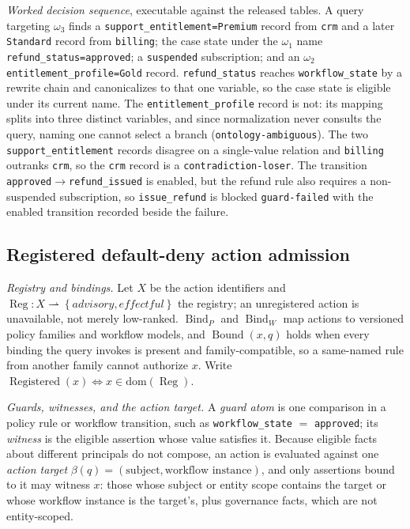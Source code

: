 \documentclass[conference]{IEEEtran}
\newcommand{\reason}[1]{\texttt{#1}}
\newcommand{\set}[1]{\left\{#1\right\}}
\begin{document}
\smallskip
\noindent\textit{Worked decision sequence}, executable against the released tables. A query targeting $\omega_3$ finds a \texttt{support\_entitlement=Premium} record from \texttt{crm} and a later \texttt{Standard} record from \texttt{billing}; the case state under the $\omega_1$ name \texttt{refund\_status=approved}; a \texttt{suspended} subscription; and an $\omega_2$ \texttt{entitlement\_profile=Gold} record. \texttt{refund\_status} reaches \texttt{workflow\_state} by a rewrite chain and canonicalizes to that one variable, so the case state is eligible under its current name. The \texttt{entitlement\_profile} record is not: its mapping splits into three distinct variables, and since normalization never consults the query, naming one cannot select a branch (\reason{ontology-ambiguous}). The two \texttt{support\_entitlement} records disagree on a single-value relation and \texttt{billing} outranks \texttt{crm}, so the \texttt{crm} record is a \reason{contradiction-loser}. The transition \texttt{approved}$\rightarrow$\texttt{refund\_issued} is enabled, but the refund rule also requires a non-suspended subscription, so \texttt{issue\_refund} is blocked \reason{guard-failed} with the enabled transition recorded beside the failure.

\subsection{Registered default-deny action admission}
\emph{Registry and bindings.} Let $X$ be the action identifiers and $\operatorname{Reg}:X\rightharpoonup\set{\mathit{advisory},\mathit{effectful}}$ the registry; an unregistered action is unavailable, not merely low-ranked. $\operatorname{Bind}_P$ and $\operatorname{Bind}_W$ map actions to versioned policy families and workflow models, and $\operatorname{Bound}(x,q)$ holds when every binding the query invokes is present and family-compatible, so a same-named rule from another family cannot authorize $x$. Write $\operatorname{Registered}(x)\Leftrightarrow x\in\mathrm{dom}(\operatorname{Reg})$.

\emph{Guards, witnesses, and the action target.} A \emph{guard atom} is one comparison in a policy rule or workflow transition, such as \texttt{workflow\_state} $=$ \texttt{approved}; its \emph{witness} is the eligible assertion whose value satisfies it. Because eligible facts about different principals do not compose, an action is evaluated against one \emph{action target} $\beta(q)=(\text{subject},\text{workflow instance})$, and only assertions bound to it may witness $x$: those whose subject or entity scope contains the target or whose workflow instance is the target's, plus governance facts, which are not entity-scoped.
\end{document}
